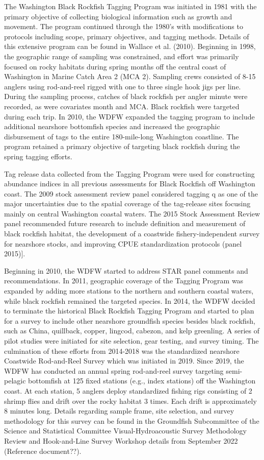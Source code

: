 \documentclass[11pt,
  english,
  letterpaper,
]{article}
\begin{document}
The Washington Black Rockfish Tagging Program was initiated in 1981 with the primary objective of collecting biological information such as growth and movement. The program continued through the 1980's with modifications to protocols including scope, primary objectives, and tagging methods. Details of this extensive program can be found in Wallace et al. (2010). Beginning in 1998, the geographic range of sampling was constrained, and effort was primarily focused on rocky habitats during spring months off the central coast of Washington in Marine Catch Area 2 (MCA 2). Sampling crews consisted of 8-15 anglers using rod-and-reel rigged with one to three single hook jigs per line. During the sampling process, catches of black rockfish per angler minute were recorded, as were covariates month and MCA. Black rockfish were targeted during each trip. In 2010, the WDFW expanded the tagging program to include additional nearshore bottomfish species and increased the geographic disbursement of tags to the entire 180-mile-long Washington coastline. The program retained a primary objective of targeting black rockfish during the spring tagging efforts.

Tag release data collected from the Tagging Program were used for constructing abundance indices in all previous assessments for Black Rockfish off Washington coast. The 2009 stock assessment review panel considered tagging q as one of the major uncertainties due to the spatial coverage of the tag-release sites focusing mainly on central Washington coastal waters. The 2015 Stock Assessment Review panel recommended future research to include definition and measurement of black rockfish habitat, the development of a coastwide fishery-independent survey for nearshore stocks, and improving CPUE standardization protocols (panel 2015){]}.

Beginning in 2010, the WDFW started to address STAR panel comments and recommendations. In 2011, geographic coverage of the Tagging Program was expanded by adding more stations to the northern and southern coastal waters, while black rockfish remained the targeted species. In 2014, the WDFW decided to terminate the historical Black Rockfish Tagging Program and started to plan for a survey to include other nearshore groundfish species besides black rockfish, such as China, quillback, copper, lingcod, cabezon, and kelp greenling. A series of pilot studies were initiated for site selection, gear testing, and survey timing. The culmination of these efforts from 2014-2018 was the standardized nearshore Coastwide Rod-and-Reel Survey which was initiated in 2019. Since 2019, the WDFW has conducted an annual spring rod-and-reel survey targeting semi-pelagic bottomfish at 125 fixed stations (e.g., index stations) off the Washington coast. At each station, 5 anglers deploy standardized fishing rigs consisting of 2 shrimp flies and drift over the rocky habitat 3 times. Each drift is approximately 8 minutes long. Details regarding sample frame, site selection, and survey methodology for this survey can be found in the Groundfish Subcommittee of the Science and Statistical Committee Visual-Hydroacoustic Survey Methodology Review and Hook-and-Line Survey Workshop details from September 2022 (Reference document??).
\end{document}
